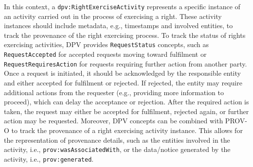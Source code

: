\documentclass{IOS-Book-Article}     %
\begin{document}




In this context, a \texttt{dpv:RightExerciseActivity} represents a specific instance of an activity carried out in the process of exercising a right.
These activity instances should include metadata, e.g., timestamps and involved entities, to track the provenance of the right exercising process.
To track the status of rights exercising activities, DPV provides \texttt{RequestStatus} concepts, such as \texttt{RequestAccepted} for accepted requests moving toward fulfilment or \texttt{RequestRequiresAction} for requests requiring further action from another party.
Once a request is initiated, it should be acknowledged by the responsible entity and either accepted for fulfilment or rejected.
If rejected, the entity may require additional actions from the requester (e.g., providing more information to proceed), which can delay the acceptance or rejection.
After the required action is taken, the request may either be accepted for fulfilment, rejected again, or further action may be requested.
Moreover, DPV concepts can be combined with PROV-O to track the provenance of a right exercising activity instance.
This allows for the representation of provenance details, such as the entities involved in the activity, i.e., \texttt{prov:wasAssociatedWith}, or the data/notice generated by the activity, i.e., \texttt{prov:generated}.
\end{document}
